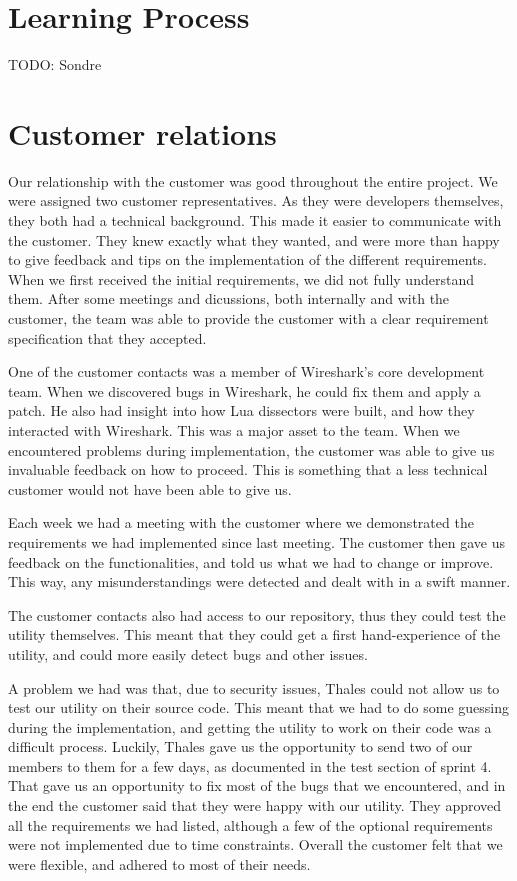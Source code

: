 \section{Learning Process}
TODO: Sondre

\section{Customer relations}
Our relationship with the customer was good throughout the entire project.
We were assigned two customer representatives. As they were developers themselves, they both had a technical background. This made it easier to communicate with the customer.
They knew exactly what they wanted, and were more than happy to give feedback and tips on the implementation of the different requirements. When we first received the initial requirements, we did not fully understand them. After some meetings and dicussions, both internally and with the customer, the team was able to provide the customer with a clear requirement specification that they accepted.

One of the customer contacts was a member of Wireshark's core development team. When we discovered bugs in Wireshark, he could fix them and apply a patch. He also had insight into how 
Lua dissectors were built, and how they interacted with Wireshark. This was a major asset to the team. When we encountered problems during implementation, the customer was able to give us invaluable feedback on how to proceed. This is something that a less technical customer would not have been able to give us.

Each week we had a meeting with the customer where we demonstrated the requirements we had implemented since last meeting. The customer then gave us feedback on the functionalities, and told us what we had to change or improve. This way, any misunderstandings were detected and dealt with in a swift manner.

The customer contacts also had access to our repository, thus they could test the utility themselves.
This meant that they could get a first hand-experience of the utility, and could more easily detect bugs and other issues.	

A problem we had was that, due to security issues, Thales could not allow us to test our utility on their source code. This meant that we had to do some guessing during the implementation, and getting the utility to work on their code was a difficult process. Luckily, Thales gave us the opportunity to send two of our members to them for a few days, as documented in the test section of sprint 4. That gave us an opportunity to fix most of the bugs that we encountered, and in the end the customer said that they were happy with our utility. They approved all the requirements we had listed, although a few of the optional requirements were not implemented due to time constraints.
Overall the customer felt that we were flexible, and adhered to most of their needs.

